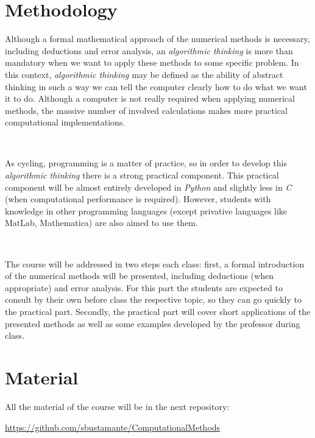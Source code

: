 \documentclass[a4,useAMS,usenatbib,usegraphicx,12pt]{article}
\begin{document}
\section*{Methodology}

Although a formal mathematical approach of the numerical methods is necessary, 
including deductions and error analysis, an \textit{algorithmic thinking} is more
than mandatory when we want to apply these methods to some specific problem. In
this context, \textit{algorithmic thinking} may be defined as the ability of 
abstract thinking in such a way we can tell the computer clearly how to do what 
we want it to do. Although a computer is not really required when applying 
numerical methods, the massive number of involved calculations makes more 
practical computational implementations.

\

As cycling, programming is a matter of practice, so in order to develop this 
\textit{algorithmic thinking} there is a strong practical component. This 
practical component will be almost entirely developed in \textit{Python} and 
slightly less in \textit{C} (when computational performance is required). 
However, students with knowledge in other programming languages (except
privative languages like MatLab, Mathematica) are also aimed to use them.

\

The course will be addressed in two steps each class: first, a formal 
introduction of the numerical methods will be presented, including deductions 
(when appropriate) and error analysis. For this part the students are expected 
to consult by their own before class the respective topic, so they can go 
quickly to the practical part. Secondly, the practical part will cover short
applications of the presented methods as well as some examples developed by
the professor during class.

\section*{Material}

All the material of the course will be in the next repository:

\url{ https://github.com/sbustamante/ComputationalMethods }
\end{document}
